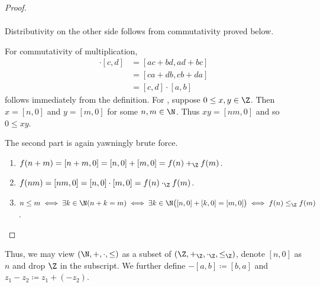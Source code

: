 \begin{proof}
\begin{enumerate}[label=\small(R\arabic*)]
\begin{align*}
        \end{align*}
        Distributivity on the other side follows from commutativity proved
        below.
    \end{enumerate}
    For commutativity of multiplication, \begin{align*}
        [a, b] \cdot [c, d] &= [ac + bd, ad + bc] \\
            &= [ca + db, cb + da] \\
            &= [c, d] \cdot [a, b]
    \end{align*}
     follows immediately from the
    definition.
    For , suppose $0 \le x, y \in \Z$.
    Then $x = [n, 0]$ and $y = [m, 0]$ for some $n, m \in \N$.
    Thus $xy = [nm, 0]$ and so $0 \le xy$.

    The second part is again yawningly brute force.
    \begin{enumerate}
        \item $f(n + m) = [n + m, 0] = [n, 0] + [m, 0] = f(n) +_\Z f(m)$.
        \item $f(nm) = [nm, 0] = [n, 0] \cdot [m, 0] = f(n) \cdot_\Z
        f(m)$.
        \item $n \le m \iff \exists k \in \N (n + k = m) \iff \exists k \in \N
        \big([n, 0] + [k, 0] = [m, 0]\big) \iff f(n) \le_\Z f(m)$. \qedhere
    \end{enumerate}
\end{proof}
Thus, we may view $(\N, +, \cdot, \le)$ as a subset of $(\Z, +_\Z, \cdot_\Z,
\le_\Z)$, denote $[n, 0]$ as $n$ and drop $\Z$ in the subscript.
We further define $-[a, b] \coloneq [b, a]$ and $z_1 - z_2 \coloneq z_1 +
(-z_2)$.

